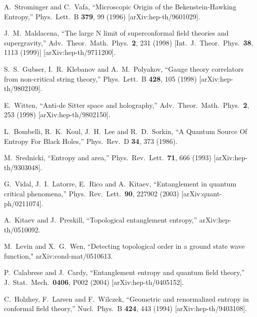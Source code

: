 \documentclass[amsmath,amssymb,nofootinbib,eqsecnum,tighten,prd,12pt]{revtex4}
\begin{document}
\begin{thebibliography}{99}


  A.~Strominger and C.~Vafa,
  ``Microscopic Origin of the Bekenstein-Hawking Entropy,''
  Phys.\ Lett.\ B {\bf 379}, 99 (1996)
  [arXiv:hep-th/9601029].


 J.~M.~Maldacena,
  ``The large N limit of superconformal field theories and supergravity,''
  Adv.\ Theor.\ Math.\ Phys.\  {\bf 2}, 231 (1998)
  [Int.\ J.\ Theor.\ Phys.\  {\bf 38}, 1113 (1999)]
  [arXiv:hep-th/9711200].

S.~S.~Gubser, I.~R.~Klebanov and A.~M.~Polyakov,
  ``Gauge theory correlators from non-critical string theory,''
  Phys.\ Lett.\ B {\bf 428}, 105 (1998)
  [arXiv:hep-th/9802109].

E.~Witten,
  ``Anti-de Sitter space and holography,''
  Adv.\ Theor.\ Math.\ Phys.\  {\bf 2}, 253 (1998)
  [arXiv:hep-th/9802150].

 L.~Bombelli, R.~K.~Koul, J.~H.~Lee and R.~D.~Sorkin,
 ``A Quantum Source Of Entropy For Black Holes,''  Phys.\
 Rev.\ D {\bf 34}, 373 (1986).

 M.~Srednicki,
  ``Entropy and area,''
  Phys.\ Rev.\ Lett.\  {\bf 71}, 666 (1993)
  [arXiv:hep-th/9303048].
  
 G.~Vidal, J.~I.~Latorre, E.~Rico and A.~Kitaev,
 ``Entanglement in quantum critical phenomena,''
 Phys.\ Rev.\ Lett.\  {\bf 90}, 227902 (2003)
 [arXiv:quant-ph/0211074].
  
 
 A.~Kitaev and J.~Preskill,
  ``Topological entanglement entropy,''
  arXiv:hep-th/0510092.

M.\ Levin and X.\ G.\ Wen,
``Detecting topological order in a ground state wave function,"
arXiv:cond-mat/0510613.

P.~Calabrese and J.~Cardy,
  ``Entanglement entropy and quantum field theory,''
  J.\ Stat.\ Mech.\  {\bf 0406}, P002 (2004)
  [arXiv:hep-th/0405152].


C.~Holzhey, F.~Larsen and F.~Wilczek,
  ``Geometric and renormalized entropy in conformal field theory,''
  Nucl.\ Phys.\ B {\bf 424}, 443 (1994)
  [arXiv:hep-th/9403108].


\end{thebibliography}
\end{document}
